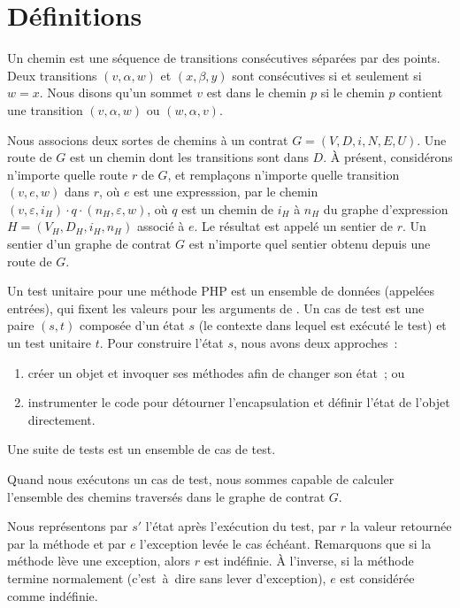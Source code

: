 \section{Définitions}
\label{section:test:definitions}

Un {\strong chemin} est une séquence de transitions consécutives séparées par
des points. Deux transitions $(v, \alpha, w)$ et $(x, \beta, y)$ sont
consécutives si et seulement si $w = x$. Nous disons qu'un sommet $v$ {\strong
est dans} le chemin $p$ si le chemin $p$ contient une transition $(v, \alpha,
w)$ ou $(w, \alpha, v)$.

Nous associons deux sortes de chemins à un contrat $G = (V, D, i, N, E, U)$. Une
{\strong route} de $G$ est un chemin dont les transitions sont dans $D$.
À présent, considérons n'importe quelle route $r$ de $G$, et remplaçons
n'importe quelle transition $(v, e, w)$ dans $r$, où $e$ est une expresssion,
par le chemin $(v, \varepsilon, i_H) \cdot q \cdot (n_H, \varepsilon, w)$, où
$q$ est un chemin de $i_H$ à $n_H$ du graphe d'expression $H = (V_H, D_H, i_H,
n_H)$ associé à $e$.  Le résultat est appelé un {\strong sentier} de $r$. Un
sentier d'un graphe de contrat $G$ est n'importe quel sentier obtenu depuis une
route de $G$.

Un {\strong test unitaire} pour une méthode PHP  est un ensemble de
données (appelées entrées), qui fixent les valeurs pour les
arguments de . Un {\strong cas de test} est une paire $(s, t)$ composée
d'un état $s$ (le contexte dans lequel est exécuté le test) et un test unitaire
$t$. Pour construire l'état $s$, nous avons deux approches~:
%
\begin{enumerate}

\item créer un objet et invoquer ses méthodes afin de changer son état~; ou

\item instrumenter le code pour détourner l'encapsulation et définir l'état de
l'objet directement.

\end{enumerate}
%
Une {\strong suite de tests} est un ensemble de cas de test.

Quand nous exécutons un cas de test, nous sommes capable de calculer l'ensemble
des chemins traversés dans le graphe de contrat $G$.

Nous représentons par $s'$ l'état après l'exécution du test, par $r$ la valeur
retournée par la méthode  et par $e$ l'exception levée le cas échéant.
Remarquons que si la méthode lève une exception, alors $r$ est indéfinie. À
l'inverse, si la méthode termine normalement (c'est~à~dire sans lever
d'exception), $e$ est considérée comme indéfinie.


